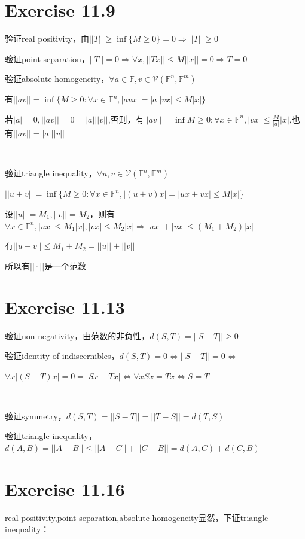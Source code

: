 \documentclass[twoside,a4paper]{article}
\begin{document}
\pagestyle{fancy}
\fancyhead{}

\section{Exercise 11.9}

验证real positivity，由$||T||\ge \inf\{M\ge 0\}=0\Rightarrow ||T||\ge 0$

验证point separation，$||T||=0\Rightarrow \forall x,||Tx||\le M||x||=0\Rightarrow T=0$

验证absolute homogeneity，$\forall a\in \mathbb{F},v\in \mathcal{V}(\mathbb{F}^n,\mathbb{F}^m)$

有$||av||=\inf\{M\ge 0:\forall x\in \mathbb{F}^n,|avx|=|a||vx|\le M|x|\}$

若$|a|=0,||av||=0=|a|||v||$,否则，有$||av||=\inf{M\ge 0:\forall x\in \mathbb{F}^n,|vx|\le \frac{M}{|a|}|x|}$,也有$||av||=|a|||v||$

\

验证triangle inequality，$\forall u,v\in \mathcal{V}(\mathbb{F}^n,\mathbb{F}^m)$


$||u+v||=\inf\{M\ge 0:\forall x\in \mathbb{F}^n,|(u+v)x|=|ux+vx|\le M|x|\}$

设$||u||=M_1,||v||=M_2$，则有$\forall x\in \mathbb{F}^n,|ux|\le M_1|x|,|vx|\le M_2|x|\Rightarrow |ux|+|vx|\le (M_1+M_2)|x|$

有$||u+v||\le M_1+M_2=||u||+||v||$

所以有$||\cdot||$是一个范数

\section{Exercise 11.13}
验证non-negativity，由范数的非负性，$d(S,T)=||S-T||\ge 0$

验证identity of indiscernibles，$d(S,T)=0\Leftrightarrow ||S-T||=0 \Leftrightarrow $

$\forall x |(S-T)x|=0=|Sx-Tx|\Leftrightarrow \forall x Sx=Tx \Leftrightarrow S=T$

\

验证symmetry，$d(S,T)=||S-T||=||T-S||=d(T,S)$

验证triangle inequality，$d(A,B)=||A-B||\le ||A-C||+||C-B||=d(A,C)+d(C,B)$

\section{Exercise 11.16}
real positivity,point separation,absolute homogeneity显然，下证triangle inequality：
\end{document}
